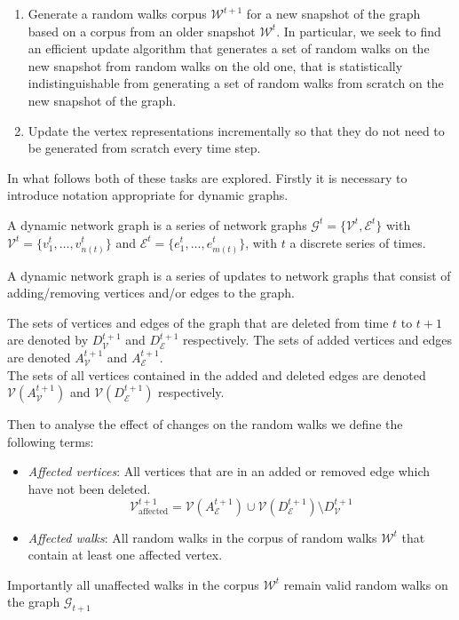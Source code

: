 \documentclass[a4paper]{article}
\renewcommand{\G}{\mathcal G}
\renewcommand{\V}{\mathcal V}
\newcommand{\W}{\mathcal W}
\begin{document}
\begin{enumerate}
\item Generate a random walks corpus $\W^{t+1}$ for a new snapshot of the graph based on
  a corpus from an older snapshot $\W^t$. In particular,
  we seek to find an efficient update algorithm that generates a set of random
  walks on the new snapshot from random walks on the old one, that is
  statistically indistinguishable from generating a set of random walks from
  scratch on the new snapshot of the graph.
  
\item  Update the vertex representations incrementally so that they do not need
  to be generated from scratch every time step.
  
\end{enumerate}
In what follows both of these tasks are explored. Firstly it is necessary to introduce notation appropriate for dynamic graphs.
\begin{definition}
A dynamic network graph is a series of network graphs $\G^t = \{\V^t,
  \mathcal{E}^t\}$ with $\V^t = \{v_1^t, \dots, v_{n(t)}^t\}$ and $\mathcal{E}^t = \{e_1^t, \dots,
  e_{m(t)}^t\}$, with $t$ a discrete series of times.
\end{definition}
A dynamic network graph is a series of updates to network graphs that consist of
adding/removing vertices and/or edges to the graph.
\begin{definition}
  The sets of vertices and edges of the graph that are deleted from time $t$
  to $t+1$ are denoted by $D_{\V}^{t+1}$ and $D_{\mathcal{E}}^{t+1}$ respectively. The
  sets of added vertices and edges are denoted $A_{\V}^{t+1}$ and
  $A_{\mathcal{E}}^{t+1}$.\\
  The sets of all vertices contained in the added and deleted edges are denoted
  $\V(A_{\V}^{t+1})$ and $\V(D_{\mathcal{E}}^{t+1})$ respectively.
\end{definition}
Then to analyse the effect of changes on the random walks we define the
following terms:
\begin{itemize}
  \item \textit{Affected vertices}: All vertices that are in an added or removed
    edge which have not been deleted.
    \[\V_{\text{affected}}^{t+1} = \V(A_{\mathcal{E}}^{t+1}) \cup
      \V(D_{\mathcal{E}}^{t+1}) \setminus D_{\V}^{t+1}\]
    \item \textit{Affected walks}: All random walks in the corpus of random walks
      $\W^t$ that contain at least one affected vertex.
    \end{itemize}
Importantly all unaffected walks in the corpus $\W^t$ remain valid random walks
on the graph $\G_{t+1}$
\end{document}
